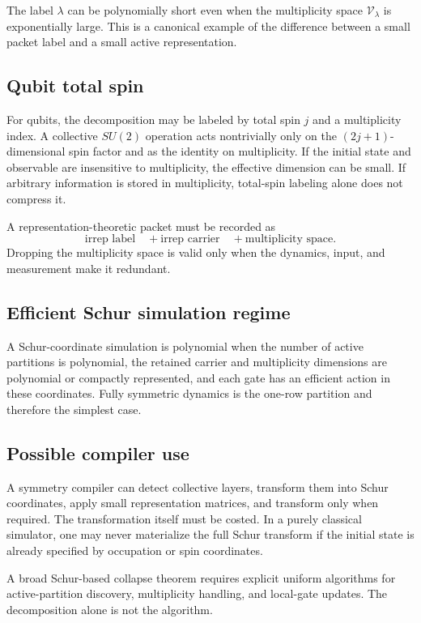 The label $\lambda$ can be polynomially short even when the multiplicity space $\mathcal V_\lambda$ is exponentially large. This is a canonical example of the difference between a small packet label and a small active representation.

\subsection{Qubit total spin}
For qubits, the decomposition may be labeled by total spin $j$ and a multiplicity index. A collective $SU(2)$ operation acts nontrivially only on the $(2j+1)$-dimensional spin factor and as the identity on multiplicity. If the initial state and observable are insensitive to multiplicity, the effective dimension can be small. If arbitrary information is stored in multiplicity, total-spin labeling alone does not compress it.

\begin{principle}
A representation-theoretic packet must be recorded as
\[
\text{irrep label}
\quad+
\text{irrep carrier}
\quad+
\text{multiplicity space}.
\]
Dropping the multiplicity space is valid only when the dynamics, input, and measurement make it redundant.
\end{principle}

\subsection{Efficient Schur simulation regime}
A Schur-coordinate simulation is polynomial when the number of active partitions is polynomial, the retained carrier and multiplicity dimensions are polynomial or compactly represented, and each gate has an efficient action in these coordinates. Fully symmetric dynamics is the one-row partition and therefore the simplest case.

\subsection{Possible compiler use}
A symmetry compiler can detect collective layers, transform them into Schur coordinates, apply small representation matrices, and transform only when required. The transformation itself must be costed. In a purely classical simulator, one may never materialize the full Schur transform if the initial state is already specified by occupation or spin coordinates.

\begin{frontierbox}
A broad Schur-based collapse theorem requires explicit uniform algorithms for active-partition discovery, multiplicity handling, and local-gate updates. The decomposition alone is not the algorithm.
\end{frontierbox}

